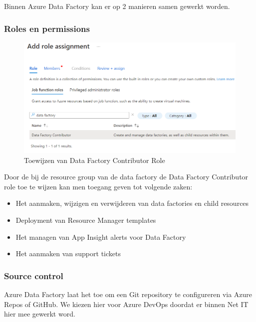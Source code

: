 Binnen Azure Data Factory kan er op 2 manieren samen gewerkt worden. 

\subsubsection{Roles en permissions}

\begin{figure}[H]
    \centering
    \includegraphics[width=1\textwidth]{./graphics/adf/adf_contributor.png}
    \caption{Toewijzen van Data Factory Contributor Role}
\end{figure}

Door de bij de resource group van de data factory de Data Factory Contributor role toe te wijzen kan men toegang geven tot volgende zaken:
\begin{itemize}
    \item Het aanmaken, wijzigen en verwijderen van data factories en child resources
    \item Deployment van Resource Manager templates
    \item Het managen van App Insight alerts voor Data Factory
    \item Het aanmaken van support tickets
\end{itemize}

\subsubsection{Source control}

Azure Data Factory laat het toe om een Git repository te configureren via Azure Repos of GitHub. We kiezen hier voor Azure DevOps doordat er binnen Net IT hier mee gewerkt word.


